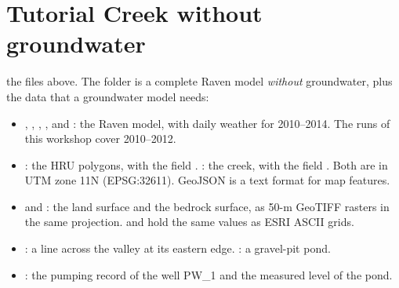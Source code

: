 \section{Tutorial Creek without groundwater}

\see the files above. The folder is a complete Raven model \emph{without} groundwater, plus the data that a groundwater
model needs:
\begin{itemize}
\item {}, , , ,  and : the Raven model, with daily
  weather for 2010--2014. The runs of this workshop cover 2010--2012.
\item {}: the HRU polygons, with the field . : the creek, with the field
  . Both are in UTM zone 11N (EPSG:32611). GeoJSON is a text format for map features.
\item {} and : the land surface and the bedrock surface, as 50-m GeoTIFF rasters in the same
  projection.  and  hold the same values as ESRI ASCII grids.
\item {}: a line across the valley at its eastern edge. : a gravel-pit pond.
\item {}: the pumping record of the well PW\_1 and the measured level of the pond.
\end{itemize}

